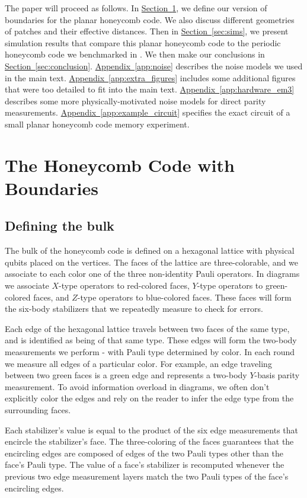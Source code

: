 \documentclass[onecolumn,unpublished,a4paper]{quantumarticle}
\theoremstyle{definition}
\theoremstyle{definition}
\theoremstyle{definition}
\renewcommand{\sec}[1]{\hyperref[sec:#1]{Section~\ref*{sec:#1}}}
\DeclareRobustCommand{\app}[1]{\hyperref[app:#1]{Appendix~\ref*{app:#1}}}
\begin{document}
The paper will proceed as follows.  
In \sec{boundaries}, we define our version of boundaries for the planar honeycomb code. 
We also discuss different geometries of patches and their effective distances.
Then in \sec{sims}, we present simulation results that compare this planar honeycomb code to the periodic honeycomb code we benchmarked in \cite{gidney2021honeycombmemory}.
We then make our conclusions in \sec{conclusion}.
\app{noise} describes the noise models we used in the main text.
\app{extra_figures} includes some additional figures that were too detailed to fit into the main text.
\app{hardware_em3} describes some more physically-motivated noise models for direct parity measurements. 
\app{example_circuit} specifies the exact circuit of a small planar honeycomb code memory experiment.

\section{The Honeycomb Code with Boundaries}
\label{sec:boundaries}

\subsection{Defining the bulk}

The bulk of the honeycomb code is defined on a hexagonal lattice with physical qubits placed on the vertices.  
The faces of the lattice are three-colorable, and we associate to each color one of the three non-identity Pauli operators.  
In diagrams we associate $X$-type operators to red-colored faces, $Y$-type operators to green-colored faces, and $Z$-type operators to blue-colored faces.  
These faces will form the six-body stabilizers that we repeatedly measure to check for errors. 

Each edge of the hexagonal lattice travels between two faces of the same type, and is identified as being of that same type.
These edges will form the two-body measurements we perform - with Pauli type determined by color.
In each round we measure all edges of a particular color.
For example, an edge traveling between two green faces is a green edge and represents a two-body $Y$-basis parity measurement.
To avoid information overload in diagrams, we often don't explicitly color the edges and rely on the reader to infer the edge type from the surrounding faces.

Each stabilizer's value is equal to the product of the six edge measurements that encircle the stabilizer's face.
The three-coloring of the faces guarantees that the encircling edges are composed of edges of the two Pauli types other than the face's Pauli type.
The value of a face's stabilizer is recomputed whenever the previous two edge measurement layers match the two Pauli types of the face's encircling edges.
\end{document}
